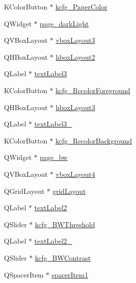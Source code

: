\begin{DoxyCompactItemize}
\item 
K\+Color\+Button $\ast$ \hyperlink{classUi__DlgAccessibilityBase_ab1e0b4e4d2995754bd22f47faf578f96}{kcfg\+\_\+\+Paper\+Color}
\item 
Q\+Widget $\ast$ \hyperlink{classUi__DlgAccessibilityBase_ac6a05225066cc7e921a37af4468a95df}{page\+\_\+dark\+Light}
\item 
Q\+V\+Box\+Layout $\ast$ \hyperlink{classUi__DlgAccessibilityBase_ada0b3cf9426af07f6a737df4a9d26e5d}{vbox\+Layout3}
\item 
Q\+H\+Box\+Layout $\ast$ \hyperlink{classUi__DlgAccessibilityBase_a34b627c6efb167bcdb5222438bdbf99e}{hbox\+Layout2}
\item 
Q\+Label $\ast$ \hyperlink{classUi__DlgAccessibilityBase_ab4f97510e236d55ac92d0c0befc04068}{text\+Label3}
\item 
K\+Color\+Button $\ast$ \hyperlink{classUi__DlgAccessibilityBase_a14be3b2a0c3099a08d2e58732feca0e6}{kcfg\+\_\+\+Recolor\+Foreground}
\item 
Q\+H\+Box\+Layout $\ast$ \hyperlink{classUi__DlgAccessibilityBase_a57d0e60ec2c59778e84266108b3c9d03}{hbox\+Layout3}
\item 
Q\+Label $\ast$ \hyperlink{classUi__DlgAccessibilityBase_a87a49764d21731bab617cdbe42f2b263}{text\+Label3\+\_}
\item 
K\+Color\+Button $\ast$ \hyperlink{classUi__DlgAccessibilityBase_a3dfcfe3b0a86924c2c0eda7ec68f3d2a}{kcfg\+\_\+\+Recolor\+Background}
\item 
Q\+Widget $\ast$ \hyperlink{classUi__DlgAccessibilityBase_ad6248c8c27f576cedc9e49b6144c4bc4}{page\+\_\+bw}
\item 
Q\+V\+Box\+Layout $\ast$ \hyperlink{classUi__DlgAccessibilityBase_ae920274bca545ba85ff1578ed4317d56}{vbox\+Layout4}
\item 
Q\+Grid\+Layout $\ast$ \hyperlink{classUi__DlgAccessibilityBase_a5f8944bbf69c844201c6fbfc3436c89b}{grid\+Layout}
\item 
Q\+Label $\ast$ \hyperlink{classUi__DlgAccessibilityBase_a86309f7fdcc0194a41f39ae3bc98fa6e}{text\+Label2}
\item 
Q\+Slider $\ast$ \hyperlink{classUi__DlgAccessibilityBase_a7be84a94ca25ab0c8bf269ef4fd69294}{kcfg\+\_\+\+B\+W\+Threshold}
\item 
Q\+Label $\ast$ \hyperlink{classUi__DlgAccessibilityBase_a2994502da41dffae4e1691734c4c352b}{text\+Label2\+\_}
\item 
Q\+Slider $\ast$ \hyperlink{classUi__DlgAccessibilityBase_a4b034ff4228747708c7eeba77bc58734}{kcfg\+\_\+\+B\+W\+Contrast}
\item 
Q\+Spacer\+Item $\ast$ \hyperlink{classUi__DlgAccessibilityBase_a2fa40aa9319045894111f40c872dd4d5}{spacer\+Item1}
\end{DoxyCompactItemize}


